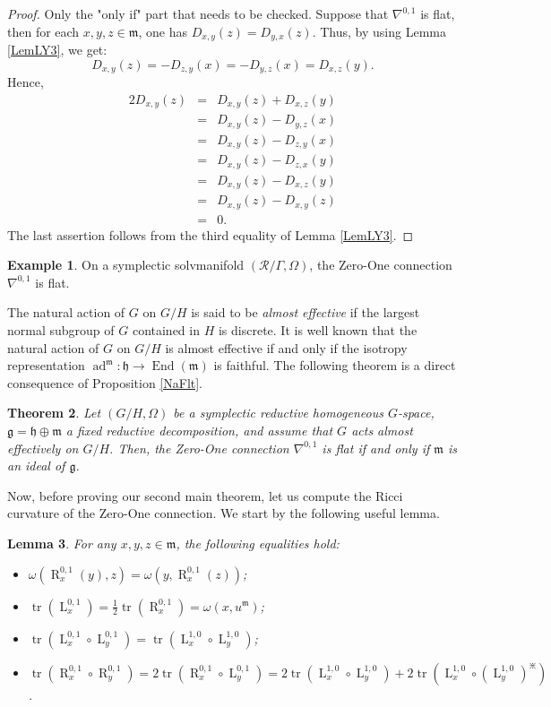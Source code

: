 \documentclass[preprint,12pt,1p]{elsarticle}
\theoremstyle{plain}
\newtheorem{theorem}{Theorem}[section]
\newtheorem{lemma}[theorem]{Lemma}
\theoremstyle{definition}
\newtheorem{example}[theorem]{Example}
\newcommand{\ro}{\circ}
\newcommand{\n}{\nabla}
\newcommand{\nc}{\n^{0,1}}
\newcommand{\tr}{\operatorname{tr}}
\newcommand{\End}{\operatorname{End}}
\newcommand{\g}{\mathfrak{g}}
\newcommand{\h}{\mathfrak{h}}
\newcommand{\m}{\mathfrak{m}}
\newcommand{\ad}{\operatorname{ad}}
\newcommand{\la}{\operatorname{L}^{0,1}}
\newcommand{\ra}{\operatorname{R}^{0,1}}
\newcommand{\lm}{\operatorname{L}^{1,0}}
\numberwithin{equation}{section}
\newcommand{\aj}{\divideontimes}
\begin{document}
\begin{proof}
Only the "only if" part that needs to be checked. Suppose that $\nc$ is flat, then for each $x,y,z\in\mathfrak{m}$, one has $D_{x,y}(z)=D_{y,x}(z)$. Thus, by using Lemma \ref{LemLY3}, we get:
\begin{equation*}
D_{x,y}(z)=-D_{z,y}(x)=-D_{y,z}(x)=D_{x,z}(y).
\end{equation*}
Hence,
\begin{eqnarray*}
2D_{x,y}(z)&=&D_{x,y}(z)+D_{x,z}(y)\\
&=&D_{x,y}(z)-D_{y,z}(x)\\
&=&D_{x,y}(z)-D_{z,y}(x)\\
&=&D_{x,y}(z)-D_{z,x}(y)\\
&=&D_{x,y}(z)-D_{x,z}(y)\\
&=&D_{x,y}(z)-D_{x,y}(z)\\
&=&0.
\end{eqnarray*}
The last assertion follows from the third equality of Lemma \ref{LemLY3}.
\end{proof}

\begin{example}
On a symplectic solvmanifold $(\mathcal{R}/\Gamma,\Omega)$, the Zero-One connection $\nc$ is flat.
\end{example}

The natural action of $G$ on $G/H$ is said to be \textit{almost effective} if the largest normal subgroup of $G$ contained in $H$ is discrete. It is well known that the natural action of $G$ on $G/H$ is almost effective if and only if the isotropy representation $\ad^\m:\h\to\End(\mathfrak{m})$ is faithful. The following theorem is a direct consequence of Proposition \ref{NaFlt}. 

\begin{theorem}\label{ncFlt}
Let $(G/H,\Omega)$ be a symplectic reductive homogeneous $G$-space, $\g=\h\oplus\m$ a fixed reductive decomposition, and assume that $G$ acts almost effectively on $G/H$. Then, the Zero-One connection $\nc$ is flat if and only if $\mathfrak{m}$ is an ideal of $\mathfrak{g}$. 
\end{theorem}

Now, before proving our second main theorem, let us compute the Ricci curvature of the Zero-One connection. We start by the following useful lemma.

\begin{lemma}\label{tL,tR}
For any $x,y,z\in\mathfrak{m}$, the following equalities hold:
\begin{itemize}
\item[$1.$] $\omega\left(\ra_x(y),z\right)=\omega\left(y,\ra_x(z)\right)$;
\item[$2.$] $\tr(\la_x)=\tfrac{1}{2}\tr(\ra_x)=\omega\left(x,u^\mathfrak{m}\right)$;
\item[$3.$] $\tr(\la_x\ro\la_y)=\tr\left(\lm_x\ro\lm_y\right)$;
\item[$4.$] $\tr(\ra_x\ro\ra_y)=2\tr(\ra_x\ro\la_y)=2\tr\left(\lm_x\ro\lm_y\right)+2\tr\left(\lm_x\ro\left(\lm_y\right)^\aj\right)$.
\end{itemize}
\end{lemma}
\end{document}

